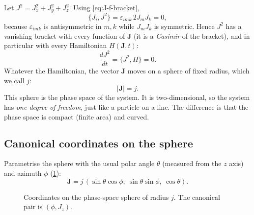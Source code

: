 \documentclass[11pt,a4paper]{article}
\newcommand{\vJ}{\bm{J}}
\newcommand{\PB}[2]{\{#1,#2\}}
\begin{document}
Let $J^2 = J_x^2 + J_y^2 + J_z^2$. Using \eqref{eq:J-f-bracket},
\begin{equation}
  \PB{J_i}{J^2} = \varepsilon_{imk}\, 2 J_m J_k = 0 ,
\end{equation}
because $\varepsilon_{imk}$ is antisymmetric in $m,k$ while $J_m J_k$ is symmetric. Hence $J^2$ has a vanishing bracket
with every function of $\vJ$ (it is a \emph{Casimir} of the bracket), and in particular with every Hamiltonian
$H(\vJ,t)$:
\begin{equation}
  \frac{d J^2}{dt} = \PB{J^2}{H} = 0 .
\end{equation}
Whatever the Hamiltonian, the vector $\vJ$ moves on a sphere of fixed radius, which we call $j$:
\begin{equation}
  |\vJ| = j .
\end{equation}
This sphere is the phase space of the system. It is two-dimensional, so the system has \emph{one degree of freedom},
just like a particle on a line. The difference is that the phase space is compact (finite area) and curved.

\subsection{Canonical coordinates on the sphere}\label{sec:canonical}

Parametrise the sphere with the usual polar angle $\theta$ (measured from the $z$ axis) and azimuth $\phi$
(\cref{fig:sphere-coords}):
\begin{equation}\label{eq:spherical}
  \vJ = j\,(\sin\theta\cos\phi,\ \sin\theta\sin\phi,\ \cos\theta).
\end{equation}
\begin{figure}[!htbp]
  \centering
  \caption{Coordinates on the phase-space sphere of radius $j$. The canonical pair is $(\phi, J_z)$.}
  \label{fig:sphere-coords}
\end{figure}
\end{document}
